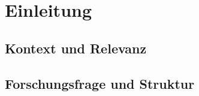 \chapter{Einleitung}
\label{chap:einleitung}


\section{Kontext und Relevanz}
\label{sec:kontext}



\section{Forschungsfrage und Struktur}
\label{sec:forschungsfrage}


